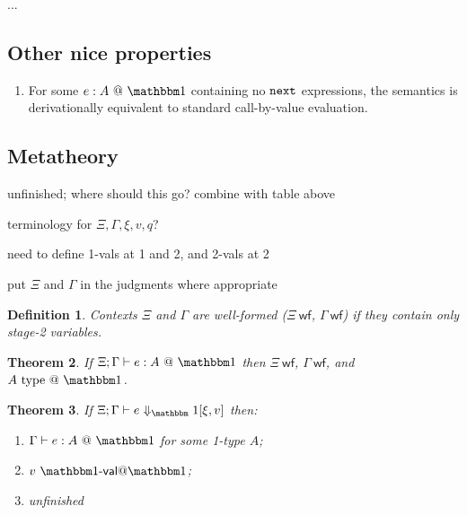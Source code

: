 \documentclass{sigplanconf}
\newtheorem{theorem}{Theorem}[section]
\newtheorem{definition}[theorem]{Definition}
\begin{document}
...

\subsection{Other nice properties}

\begin{enumerate}
\item For some $\colone{e}{A}$ containing no ${\tt next}$ expressions, the semantics is derivationally equivalent to standard call-by-value evaluation.
\end{enumerate}

\subsection{Metatheory}

\TODO unfinished; where should this go? combine with table above

\noindent\TODO terminology for $\Xi,\Gamma,\xi,v,q$?

\noindent\TODO need to define 1-vals at 1 and 2, and 2-vals at 2

\noindent\TODO put $\Xi$ and $\Gamma$ in the judgments where appropriate

\newcommand{\wf}{\ \mathsf{wf}}
\newcommand{\dom}[1]{\mathsf{dom}(#1)}
\newcommand{\valoo}{\ \bbone\textsf{-}\mathsf{val} @ \bbone}
\newcommand{\valot}{\ \bbone\textsf{-}\mathsf{val} @ \bbtwo}
\newcommand{\valtt}{\ \bbtwo\textsf{-}\mathsf{val} @ \bbtwo}

\begin{definition}
Contexts $\Xi$ and $\Gamma$ are well-formed ($\Xi\wf$, $\Gamma\wf$) if they
contain only stage-2 variables.
\end{definition}

\begin{theorem}
If $\Xi;\typesone e A$ then $\Xi\wf$, $\Gamma\wf$, and $A\istypeone$.
\end{theorem}

\begin{theorem}
If $\Xi;\Gamma\vdash\diaonesub$ then:
\begin{enumerate}
\item $\typesone e A$ for some 1-type $A$;
\item $v\valoo$;
\item \TODO unfinished
\end{enumerate}
\end{theorem}
\end{document}
